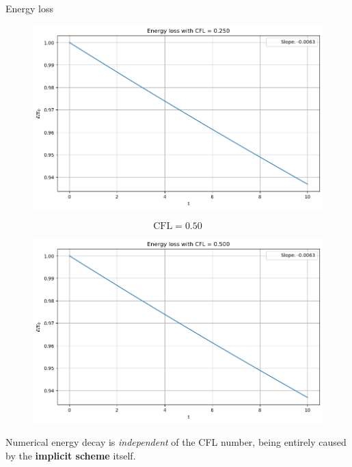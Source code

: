 \begin{frame}{Energy loss}
{\begin{minipage}{0.32\textwidth}
        \vspace{-0.2cm}

        \begin{figure}[H]
            \centering
            \includegraphics[width=\textwidth]{Immagini/plot-energy-decay-cfl-0.25.png}
        \end{figure}
    \end{minipage}
    \hfill
    \begin{minipage}{0.32\textwidth}
        \begin{equation*}
            \text{CFL}=0.50
        \end{equation*}

        \vspace{-0.2cm}

        \begin{figure}[H]
            \centering
            \includegraphics[width=\textwidth]{Immagini/plot-energy-decay-cfl-0.50.png}
        \end{figure}
    \end{minipage}}

    \vfill

    \footnotesize

    \pause

    Numerical energy decay is \textit{independent} of the CFL number, being entirely caused by the \textbf{implicit scheme} itself.

    \normalsize
\end{frame}

